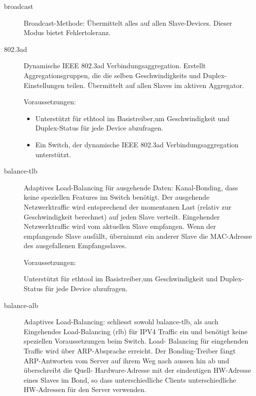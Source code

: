 \begin{description}
\begin{description}
\item [broadcast]

  Broadcast-Methode: Übermittelt alles auf allen Slave-Devices.
  Dieser Modus bietet Fehlertoleranz.

\item [802.3ad]

  Dynamische IEEE 802.3ad Verbindungsaggregation. Erstellt
  Aggregationsgruppen, die die selben Geschwindigkeits und Duplex-
  Einstellungen teilen. Übermittelt auf allen Slaves im aktiven
  Aggregator.

  Voraussetzungen:
  \begin{itemize}

    \item Unterstützt für ethtool im Basistreiber,um Geschwindigkeit
          und Duplex-Status für jede Device abzufragen.

    \item Ein Switch, der dynamische IEEE 802.3ad
    Verbindungsaggregation unterstützt.

  \end{itemize}

\item [balance-tlb]

  Adaptives Load-Balancing für ausgehende Daten: Kanal-Bonding, dass
  keine speziellen Features im Switch benötigt. Der ausgehende
  Netzwerktraffic wird entsprechend der momentanen Last (relativ zur
  Geschwindigkeit berechnet) auf jeden Slave verteilt. Eingehender
  Netzwerktraffic wird vom aktuellen Slave empfangen. Wenn der
  empfangende Slave ausfällt, übernimmt ein anderer Slave die
  MAC-Adresse des ausgefallenen Empfangsslaves.
                
  Voraussetzungen:

  Unterstützt für ethtool im Basistreiber,um Geschwindigkeit
  und Duplex-Status für jede Device abzufragen.

\item [balance-alb]

  Adaptives Load-Balancing: schliesst sowohl balance-tlb, als auch
  Eingehendes Load-Balancing (rlb) für IPV4 Traffic ein und benötigt
  keine speziellen Voraussetzungen beim Switch. Load- Balancing für
  eingehenden Traffic wird über ARP-Absprache erreicht. Der
  Bonding-Treiber fängt ARP-Antworten vom Server auf ihrem Weg nach
  aussen hin ab und überschreibt die Quell- Hardware-Adresse mit der
  eindeutigen HW-Adresse eines Slaves im Bond, so dass
  unterschiedliche Clients unterschiedliche HW-Adressen für den Server
  verwenden.
                

\end{description}
\end{description}
